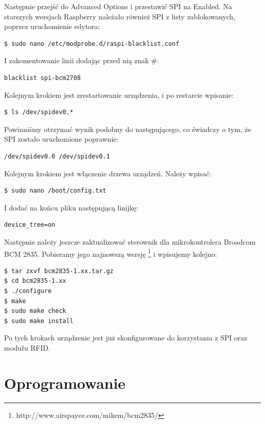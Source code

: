 Następnie przejść do Advanced Options i przestawić SPI na Enabled. Na starszych wersjach Raspberry należało również SPI z listy zablokowanych, poprzez uruchomienie edytora:

\begin{verbatim}
$ sudo nano /etc/modprobe.d/raspi-blacklist.conf
\end{verbatim}

I zakomentowanie linii dodając przed nią znak \#:

\begin{verbatim}
blacklist spi-bcm2708
\end{verbatim}

Kolejnym krokiem jest zrestartowanie urządzenia, i po restarcie wpisanie:

\begin{verbatim}
$ ls /dev/spidev0.*
\end{verbatim}

Powinniśmy otrzymać wynik podobny do następującego, co świadczy o tym, że SPI zostało uruchomione poprawnie:

\begin{verbatim}
/dev/spidev0.0 /dev/spidev0.1
\end{verbatim}

Kolejnym krokiem jest włączenie drzewa urządzeń. Należy wpisać:

\begin{verbatim}
$ sudo nano /boot/config.txt
\end{verbatim}

I dodać na końcu pliku następującą linijkę:

\begin{verbatim}
device_tree=on
\end{verbatim}

Następnie należy jeszcze zaktualizować sterownik dla mikrokontrolera Broadcom BCM 2835. Pobieramy jego najnowszą wersję \footnote{http://www.airspayce.com/mikem/bcm2835/} i wpisujemy kolejno:

\begin{verbatim}
$ tar zxvf bcm2835-1.xx.tar.gz
$ cd bcm2835-1.xx
$ ./configure
$ make
$ sudo make check
$ sudo make install
\end{verbatim}

Po tych krokach urządzenie jest już skonfigurowane do korzystania z SPI oraz modułu RFID.

\newpage

\section{Oprogramowanie}

